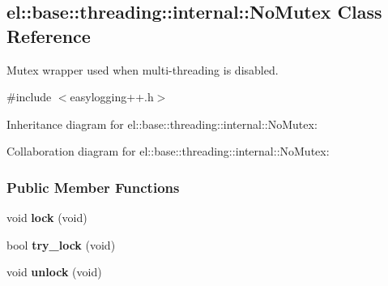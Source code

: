 \hypertarget{a00060}{}\subsection{el\+:\+:base\+:\+:threading\+:\+:internal\+:\+:No\+Mutex Class Reference}
\label{a00060}


Mutex wrapper used when multi-\/threading is disabled.  




{\ttfamily \#include $<$easylogging++.\+h$>$}



Inheritance diagram for el\+:\+:base\+:\+:threading\+:\+:internal\+:\+:No\+Mutex\+:


Collaboration diagram for el\+:\+:base\+:\+:threading\+:\+:internal\+:\+:No\+Mutex\+:
\subsubsection*{Public Member Functions}
\begin{DoxyCompactItemize}
\item 
\hypertarget{a00060_a3b38e4e9411c924daa70d358cf561b3c}{}void {\bfseries lock} (void)\label{a00060_a3b38e4e9411c924daa70d358cf561b3c}

\item 
\hypertarget{a00060_a4c0c35a99cf41f26a7608fed5609d6ae}{}bool {\bfseries try\+\_\+lock} (void)\label{a00060_a4c0c35a99cf41f26a7608fed5609d6ae}

\item 
\hypertarget{a00060_a5a248c97fee2ef0087526f2f8d3cd26e}{}void {\bfseries unlock} (void)\label{a00060_a5a248c97fee2ef0087526f2f8d3cd26e}

\end{DoxyCompactItemize}
